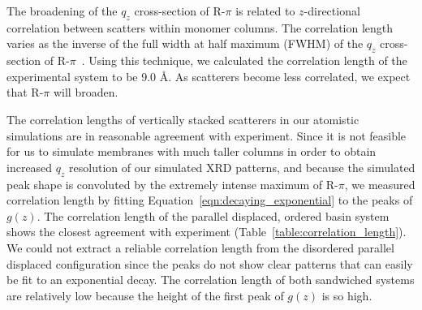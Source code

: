 %  

  The broadening of the $q_z$ cross-section of R-$\pi$ is related to
  $z$-directional correlation between scatters within monomer columns. The
  correlation length varies as the inverse of the full width at half maximum
  (FWHM) of the $q_z$ cross-section of R-$\pi$~\cite{young_highly_2013-1}. Using
  this technique, we calculated the correlation length of the experimental 
  system to be 9.0 \AA. As scatterers become less correlated, we expect that
  R-$\pi$ will broaden.

  The correlation lengths of vertically stacked scatterers in our atomistic
  simulations are in reasonable agreement with experiment. Since it is not
  feasible for us to simulate membranes with much taller columns in order to
  obtain increased $q_z$ resolution of our simulated XRD patterns, and because
  the simulated peak shape is convoluted by the extremely intense maximum of
  R-$\pi$, we measured correlation length by fitting
  Equation~\ref{eqn:decaying_exponential} to the peaks of $g(z)$. The correlation
  length of the parallel displaced, ordered basin system shows the closest
  agreement with experiment (Table~\ref{table:correlation_length}). 
  We could not extract a reliable correlation length from the disordered
  parallel displaced configuration since the peaks do not show clear patterns
  that can easily be fit to an exponential decay. The correlation length of both
  sandwiched systems are relatively low because the height of the first peak of
  $g(z)$ is so high. 
  
